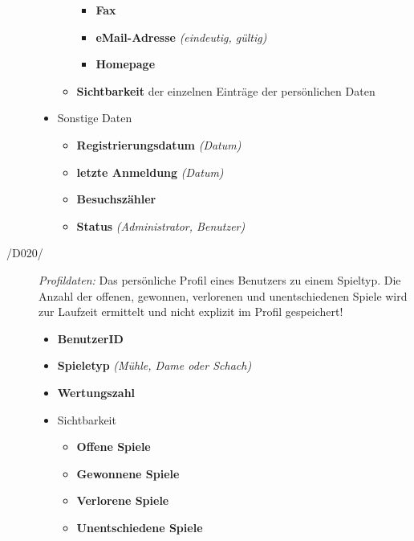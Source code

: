 \begin{description}
\begin{itemize}
\begin{itemize}
\begin{itemize}
              \item \textbf{Fax}
              \item \textbf{eMail-Adresse} \textit{(eindeutig, gültig)}
              \item \textbf{Homepage}
            \end{itemize}
          \item \textbf{Sichtbarkeit} der einzelnen Einträge der persönlichen Daten
        \end{itemize}
      \item Sonstige Daten
        \begin{itemize}
          \item \textbf{Registrierungsdatum} \textit{(Datum)}
          \item \textbf{letzte Anmeldung} \textit{(Datum)}
          \item \textbf{Besuchszähler}
          \item \textbf{Status} \textit{(Administrator, Benutzer)}
        \end{itemize}
    \end{itemize}
\end{description}

\begin{description}
  \item[/D020/]
    \textit{Profildaten:} Das persönliche Profil eines Benutzers zu einem Spieltyp.
    Die Anzahl der offenen, gewonnen, verlorenen und unentschiedenen Spiele
    wird zur Laufzeit ermittelt und nicht explizit im Profil gespeichert!
    \begin{itemize}
      \item \textbf{BenutzerID}
      \item \textbf{Spieletyp} \textit{(Mühle, Dame oder Schach)}
      \item \textbf{Wertungszahl}
      \item Sichtbarkeit
        \begin{itemize}
          \item \textbf{Offene Spiele}
          \item \textbf{Gewonnene Spiele}
          \item \textbf{Verlorene Spiele}
          \item \textbf{Unentschiedene Spiele}
        \end{itemize}
    \end{itemize}
\end{description}

